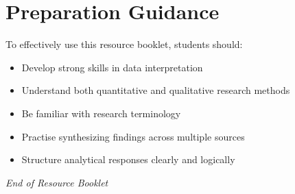 \documentclass[12pt,a4paper]{article}
\begin{document}
\section*{Preparation Guidance}

To effectively use this resource booklet, students should:

\begin{itemize}
    \item Develop strong skills in data interpretation
    \item Understand both quantitative and qualitative research methods
    \item Be familiar with research terminology
    \item Practise synthesizing findings across multiple sources
    \item Structure analytical responses clearly and logically
\end{itemize}

\vspace{2em}

\begin{center}
\textit{End of Resource Booklet}
\end{center}
\end{document}
